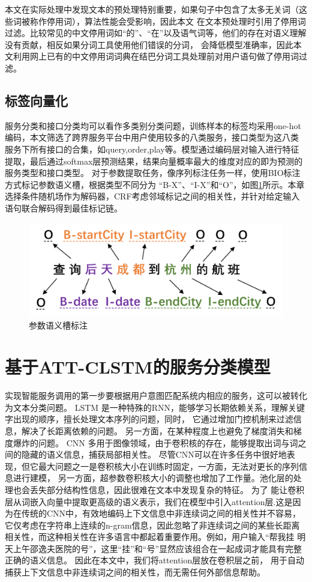 本文在实际处理中发现文本的预处理特别重要，如果句子中包含了太多无关词（这些词被称作停用词），算法性能会受影响，因此本文
在文本预处理时引用了停用词过滤。比较常见的中文停用词如“的”、“在”以及语气词等，他们的存在对语义理解没有贡献，相反如果分词工具使用他们错误的分词，
会降低模型准确率，因此本文利用网上已有的中文停用词词典在结巴分词工具处理前对用户语句做了停用词过滤。

\subsection{标签向量化}
服务分类和接口分类均可以看作多类别分类问题，训练样本的标签均采用one-hot编码，本文筛选了跨界服务平台中用户使用较多的八类服务，接口类型为这八类
服务下所有接口的合集，如query,order,play等。模型通过编码层对输入进行特征提取，最后通过softmax层预测结果，结果向量概率最大的维度对应的即为预测的服务类型和接口类型。
对于参数提取任务，像序列标注任务一样，使用BIO标注方式标记参数语义槽，根据类型不同分为
“B-X”、“I-X”和“O”，如图\ref{fig:yuyicao}所示。本章选择条件随机场作为解码器，CRF考虑邻域标记之间的相关性，并针对给定输入语句联合解码得到最佳标记链。
\begin{figure}[htbp]
  \centering
  \includegraphics[scale=0.5]{./images/yuyicao.png}
  \caption{参数语义槽标注}
  \label{fig:yuyicao}
\end{figure}

\section{基于ATT-CLSTM的服务分类模型}
实现智能服务调用的第一步要根据用户意图匹配系统内相应的服务，这可以被转化为文本分类问题。
LSTM\cite{hochreiter1997long}
是一种特殊的RNN，能够学习长期依赖关系，理解关键字出现的顺序，擅长处理文本序列的问题，同时，
它通过增加门控机制来过滤信息，解决了长距离依赖的问题。 另一方面，在某种程度上也避免了梯度消失和梯度爆炸的问题。
CNN\cite{lecun1995convolutional}
多用于图像领域，由于卷积核的存在，能够提取出词与词之间的隐藏的语义信息，捕获局部相关性。
尽管CNN可以在许多任务中很好地表现，但它最大问题之一是卷积核大小在训练时固定，一方面，无法对更长的序列信息进行建模，
另一方面，超参数卷积核大小的调整也增加了工作量。池化层的处理也会丢失部分结构性信息，因此很难在文本中发现复杂的特征。
为了
能让卷积层从词嵌入向量中提取更高级的语义表示，我们在模型中引入attention层.这是因为在传统的CNN中，有效地编码上下文信息中非连续词之间的相关性并不容易，
它仅考虑在字符串上连续的n-gram信息，因此忽略了非连续词之间的某些长距离相关性，而这种相关性在许多语言中都起着重要作用。例如，用户输入“帮我挂
明天上午邵逸夫医院的号”，这里“挂”和“号”显然应该组合在一起成词才能具有完整正确的语义信息。
因此在本文中，我们将attention层放在卷积层之前，
用于自动捕获上下文信息中非连续词之间的相关性，而无需任何外部信息帮助。


